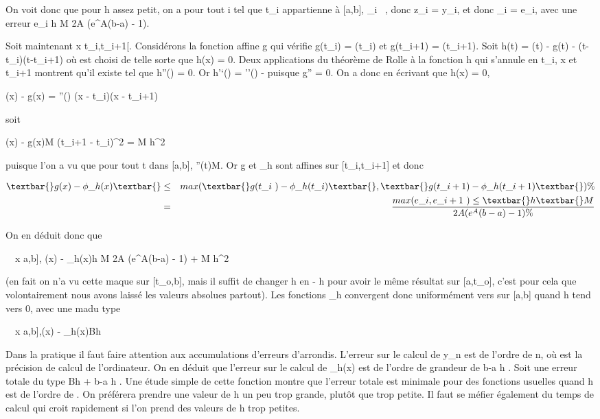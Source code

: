 \documentclass[]{article}
\begin{document}
On voit donc que pour h assez petit, on a pour tout i tel que
t\_i appartienne à {[}a,b{]}, \epsilon\_i \leq \alpha~, donc
z\_i = y\_i, et donc \epsilon\_i = e\_i, avec
une erreur e\_i \leq\textbar{}h\textbar{} M \over
2A (e^A(b-a) - 1).

Soit maintenant x \in{]}t\_i,t\_i+1{[}. Considérons la
fonction affine g qui vérifie g(t\_i) = \phi(t\_i) et
g(t\_i+1) = \phi(t\_i+1). Soit h(t) = \phi(t) - g(t) - \mu
(t-t\_i)(t-t\_i+1)  où \mu est
choisi de telle sorte que h(x) = 0. Deux applications du théorème de
Rolle à la fonction h qui s'annule en t\_i, x et t\_i+1
montrent qu'il existe \xi tel que h''(\xi) = 0. Or h'`(\xi) = \phi''(\xi) - \mu
puisque g'' = 0. On a donc en écrivant que h(x) = 0,

\phi(x) - g(x) = \phi''(\xi) (x - t\_i)(x - t\_i+1)

soit

\textbar{}\phi(x) - g(x)\textbar{}\leq M (t\_i+1 -
t\_i)^2  = M h^2

puisque l'on a vu que pour tout t dans {[}a,b{]},
\textbar{}\phi''(t)\textbar{}\leq M. Or g et \phi\_h sont affines sur
{[}t\_i,t\_i+1{]} et donc

\begin{align*} \textbar{}g(x) -
\phi\_h(x)\textbar{}& \leq&
max(\textbar{}g(t\_i~) -
\phi\_h(t\_i)\textbar{},\textbar{}g(t\_i+1) -
\phi\_h(t\_i+1)\textbar{})\%&
\\ & =&
max(e\_i,e\_i+1~)
\leq\textbar{}h\textbar{} M \over 2A
(e^A(b-a) - 1) \%& \\
\end{align*}

On en déduit donc que

\forall~~x \in {[}a,b{]}, \textbar{}\phi(x) -
\phi\_h(x)\textbar{}\leq\textbar{}h\textbar{} M \over
2A (e^A(b-a) - 1) + M h^2 

(en fait on n'a vu cette ma\jmathoration que sur {[}t\_o,b{]}, mais
il suffit de changer h en - h pour avoir le même résultat sur
{[}a,t\_o{]}, c'est pour cela que volontairement nous avons
laissé les valeurs absolues partout). Les fonctions \phi\_h
convergent donc uniformément vers \phi sur {[}a,b{]} quand h tend vers 0,
avec une ma\jmathoration du type

\forall~~x \in {[}a,b{]},\textbar{}\phi(x) -
\phi\_h(x)\textbar{}\leq B\textbar{}h\textbar{}

Dans la pratique il faut faire attention aux accumulations d'erreurs
d'arrondis. L'erreur sur le calcul de y\_n est de l'ordre de n\epsilon,
où \epsilon est la précision de calcul de l'ordinateur. On en déduit que
l'erreur sur le calcul de \phi\_h(x) est de l'ordre de grandeur de
 b-a \over h \epsilon. Soit une erreur totale du type Bh +
b-a \over h \epsilon. Une étude simple de cette fonction
montre que l'erreur totale est minimale pour des fonctions usuelles
quand h est de l'ordre de \sqrt\epsilon. On préférera
prendre une valeur de h un peu trop grande, plutôt que trop petite. Il
faut se méfier également du temps de calcul qui croit rapidement si l'on
prend des valeurs de h trop petites.
\end{document}
